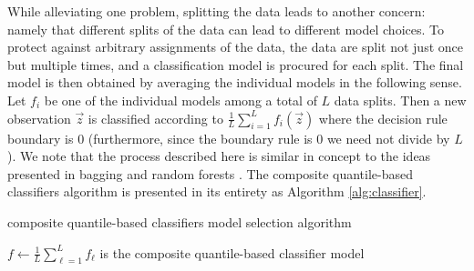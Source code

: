 While alleviating one problem, splitting the data leads to another concern:
namely that different splits of the data can lead to different model choices.
To protect against arbitrary assignments of the data, the data are split not
just once but multiple times, and a classification model is procured for each
split.  The final model is then obtained by averaging the individual models in
the following sense.  Let $f_i$ be one of the individual models among a total of
$L$ data splits.  Then a new observation $\vec{z}$ is classified according to
$\frac{1}{L} \sum_{i=1}^L f_i(\vec{z})$ where the decision rule boundary is 0
(furthermore, since the boundary rule is 0 we need not divide by $L$).  We note
that the process described here is similar in concept to the ideas presented in
bagging \cite{breiman1996} and random forests \cite{breiman2001}.  The composite
quantile-based classifiers algorithm is presented in its entirety as Algorithm
\ref{alg:classifier}.


\begin{algorithm}[ht]
  \caption{composite quantile-based classifiers model selection algorithm}
  \label{alg:classifier}
  \DontPrintSemicolon
  \BlankLine


  $f \leftarrow \frac{1}{L} \sum_{\ell=1}^L f_{\ell}$ is the composite
  quantile-based classifier model

\end{algorithm}

